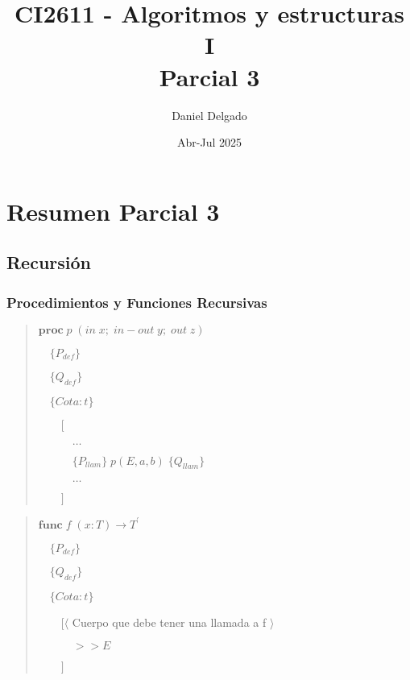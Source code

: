 \documentclass[hidelinks]{article}
\title{CI2611 - Algoritmos y estructuras I \\ Parcial 3}
\date{Abr-Jul 2025}
\author{Daniel Delgado}
\newenvironment{absolutelynopagebreak}
{\Needspace{10\baselineskip}\begin{quote}}
		{\end{quote}}
\begin{document}
\maketitle

\tableofcontents

\newpage

\section{Resumen Parcial 3}

\subsection{Recursión}\par

\subsubsection{Procedimientos y Funciones Recursivas}

\begin{absolutelynopagebreak}
	$\textbf{proc} \; p \; (in \; x; \; in-out \; y; \; out \; z)$ \par
	$\quad \{P_{def}\}$ \par
	$\quad \{Q_{def}\}$\par
	$\quad \{Cota: t\}$\par
	$\qquad [$\par
			$\qquad \quad \dots$\par
			$\qquad \quad \{P_{llam}\} \; p(E,a,b) \; \{Q_{llam}\}$\par
			$\qquad  \quad \dots $\par
			$\qquad ]$\par
\end{absolutelynopagebreak}

\begin{absolutelynopagebreak}
	$\textbf{func} \; f \; (x : T) \rightarrow T^{\prime}$ \par
	$\quad \{P_{def}\}$ \par
	$\quad \{Q_{def}\}$\par
	$\quad \{Cota: t\}$\par
	$\qquad [\langle$ Cuerpo que debe tener una llamada a f $\rangle$\par
			$\qquad  \quad >> E$\par
			$\qquad ]$\par
\end{absolutelynopagebreak}
\end{document}
